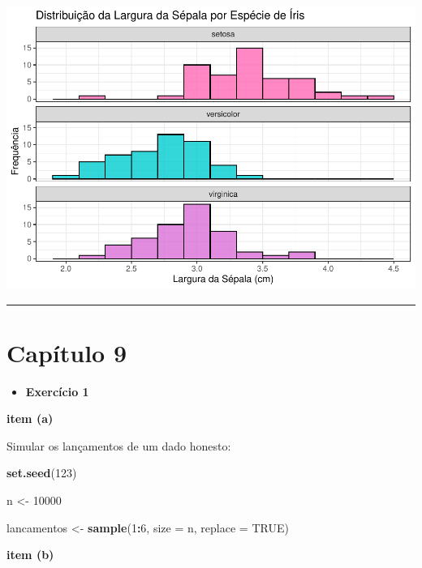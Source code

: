 \documentclass[
]{book}
\newenvironment{Shaded}{\begin{snugshade}}{\end{snugshade}}
\newcommand{\AttributeTok}[1]{\textcolor[rgb]{0.13,0.29,0.53}{#1}}
\newcommand{\ConstantTok}[1]{\textcolor[rgb]{0.56,0.35,0.01}{#1}}
\newcommand{\DecValTok}[1]{\textcolor[rgb]{0.00,0.00,0.81}{#1}}
\newcommand{\FunctionTok}[1]{\textcolor[rgb]{0.13,0.29,0.53}{\textbf{#1}}}
\newcommand{\NormalTok}[1]{#1}
\newcommand{\OtherTok}[1]{\textcolor[rgb]{0.56,0.35,0.01}{#1}}
\newcommand{\SpecialCharTok}[1]{\textcolor[rgb]{0.81,0.36,0.00}{\textbf{#1}}}
\providecommand{\tightlist}{%
  \setlength{\itemsep}{0pt}\setlength{\parskip}{0pt}}
\begin{document}
\begin{center}\includegraphics{AED_files/figure-latex/cap8_ex2-1} \end{center}

\begin{center}\rule{0.5\linewidth}{0.5pt}\end{center}

\section{Capítulo 9}\label{capuxedtulo-9}

\begin{itemize}
\tightlist
\item
  \textbf{Exercício 1}
\end{itemize}

\textbf{item (a)}

Simular os lançamentos de um dado honesto:

\begin{Shaded}
\begin{Highlighting}[]
\FunctionTok{set.seed}\NormalTok{(}\DecValTok{123}\NormalTok{)}

\NormalTok{n }\OtherTok{\textless{}{-}} \DecValTok{10000}

\NormalTok{lancamentos }\OtherTok{\textless{}{-}} \FunctionTok{sample}\NormalTok{(}\DecValTok{1}\SpecialCharTok{:}\DecValTok{6}\NormalTok{, }\AttributeTok{size =}\NormalTok{ n, }\AttributeTok{replace =} \ConstantTok{TRUE}\NormalTok{)}
\end{Highlighting}
\end{Shaded}

\textbf{item (b)}
\end{document}
